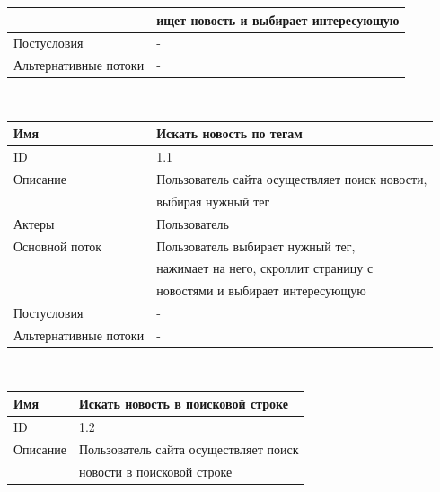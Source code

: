 \begin{center}
\begin{tabular}{|l|l|}
        & ищет новость и выбирает интересующую          \\
        \hline
        Постусловия           & -                                             \\
        \hline
        Альтернативные потоки & -                                             \\
        \hline
    \end{tabular}\\
    \vspace{0.5cm}
    \begin{tabular}{|l|l|}
        \hline
        Имя                   & Искать новость по тегам                        \\
        \hline
        ID                    & 1.1                                            \\
        \hline
        Описание              & Пользователь сайта осуществляет поиск новости, \\
        & выбирая нужный тег                             \\
        \hline
        Актеры                & Пользователь                                   \\
        \hline
        Основной поток        & Пользователь выбирает нужный тег,              \\
        & нажимает на него, скроллит страницу с          \\
        & новостями и выбирает интересующую              \\
        \hline
        Постусловия           & -                                              \\
        \hline
        Альтернативные потоки & -                                              \\
        \hline
    \end{tabular}\\
    \vspace{0.5cm}
    \begin{tabular}{|l|l|}
        \hline
        Имя                   & Искать новость в поисковой строке              \\
        \hline
        ID                    & 1.2                                            \\
        \hline
        Описание              & Пользователь сайта осуществляет поиск          \\
        & новости в поисковой строке                     \\

\end{tabular}
\end{center}
